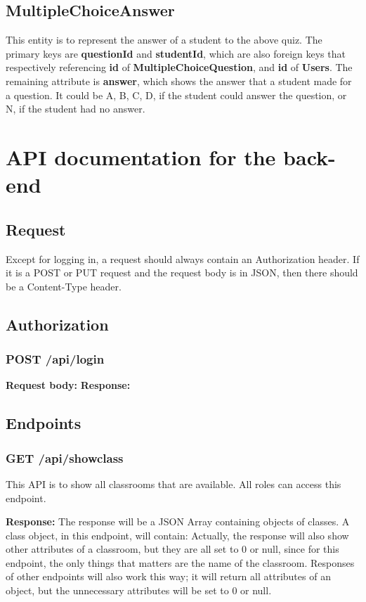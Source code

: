 \documentclass[a4paper, 11pt,openany]{book} %
\begin{document}
\subsection{MultipleChoiceAnswer}
This entity is to represent the answer of a student to the above quiz. The primary keys are \textbf{questionId} and \textbf{studentId}, which are also foreign keys that respectively referencing \textbf{id} of \textbf{MultipleChoiceQuestion}, and \textbf{id} of \textbf{Users}. The remaining attribute is \textbf{answer}, which shows the answer that a student made for a question. It could be A, B, C, D, if the student could answer the question, or N, if the student had no answer.
\section{API documentation for the back-end}

\subsection{Request}
Except for logging in, a request should always contain an Authorization header. If it is a POST or PUT request and the request body is in JSON, then there should be a Content-Type header.

\subsection{Authorization}
\subsubsection{POST /api/login}
\textbf{Request body:}
\textbf{Response:}

\subsection{Endpoints}
\subsubsection{GET /api/showclass}
This API is to show all classrooms that are available. All roles can access this endpoint.\par
\textbf{Response:}
The response will be a JSON Array containing objects of classes. A class object, in this endpoint, will contain:
Actually, the response will also show other attributes of a classroom, but they are all set to 0 or null, since for this endpoint, the only things that matters are the name of the classroom. Responses of other endpoints will also work this way; it will return all attributes of an object, but the unnecessary attributes will be set to 0 or null.
\end{document}
